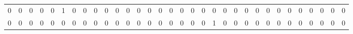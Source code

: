 \begin{tabular}{rrrrrrrrrrrrrrrrrrrrrrrrrrrrrrrr}
       0 &       0 &       0 &       0 &       0 &       1 &       0 &       0 &       0 &       0 &       0 &       0 &       0 &       0 &       0 &       0 &       0 &       0 &       0 &       0 &       0 &       0 &       0 &       0 &       0 &       0 &       0 &       0 &       0 &       0 &       0 &       0 \\
       0 &       0 &       0 &       0 &       0 &       0 &       0 &       0 &       0 &       0 &       0 &       0 &       0 &       0 &       0 &       0 &       0 &       0 &       0 &       1 &       0 &       0 &       0 &       0 &       0 &       0 &       0 &       0 &       0 &       0 &       0 &       0 \\
\hline
\end{tabular}
